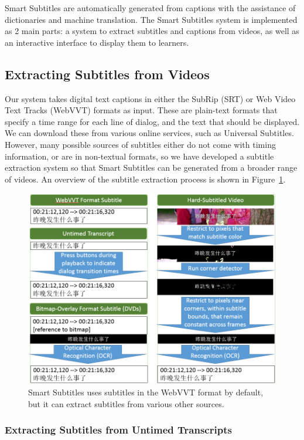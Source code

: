 \documentclass{sigchi}
\begin{document}
Smart Subtitles are automatically generated from 
captions with the assistance of dictionaries and 
machine translation. The Smart Subtitles system
is implemented as 2 main parts:
a system to extract subtitles and captions from videos, as well as an interactive interface to display them to learners.

\subsection{Extracting Subtitles from Videos}

Our system takes digital text captions in either the 
SubRip (SRT) or Web Video Text Tracks (WebVVT) formats as input.
These are plain-text formats that specify a time range for each 
line of dialog, and the text that should be displayed.
We can download these from
various online services, such as Universal Subtitles.
However, many possible sources of subtitles either
do not come with timing information, or are in
non-textual formats, so we have developed 
a subtitle extraction system so that Smart Subtitles
can be generated from a broader range of videos.
An overview of the subtitle extraction process
is shown in Figure~\ref{fig:figure3}.

\begin{figure}[!h]
\centering
\includegraphics[width=\columnwidth]{subtitle-sources}
\caption{Smart Subtitles uses subtitles in the WebVVT format
by default, but it can extract subtitles from various other sources.}
\label{fig:figure3}
\end{figure}

\subsubsection{Extracting Subtitles from Untimed Transcripts}
\end{document}
